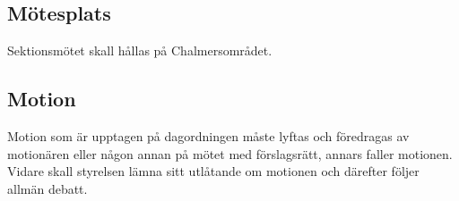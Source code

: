 \subsection{Mötesplats} 
Sektionsmötet skall hållas på Chalmersområdet. 
\subsection{Motion} 
Motion som är upptagen på dagordningen måste lyftas och föredragas av motionären eller någon annan på mötet med förslagsrätt, annars faller motionen. Vidare skall styrelsen lämna sitt utlåtande om motionen och därefter följer allmän debatt. 

\newpage


